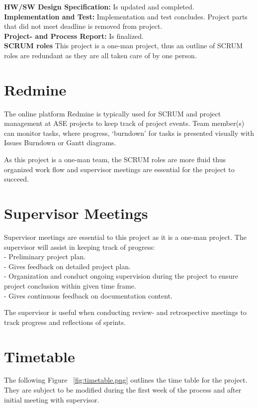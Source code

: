 \textbf{HW/SW Design Specification:} Is updated and completed. \\

\textbf{Implementation and Test:} Implementation and test concludes. Project parts that did not meet deadline is removed from project. \\

\textbf{Project- and Process Report:} Is finalized. \\

\textbf{SCRUM roles}
This project is a one-man project, thus an outline of SCRUM roles are redundant as they are all taken care of by one person. \\

\section{Redmine}
The online platform Redmine is typically used for SCRUM and project management at ASE projects to keep track of project events. Team member(s) can monitor tasks, where progress, `burndown' for tasks is presented visually with Issues Burndown or Gantt diagrams. \newline

As this project is a one-man team, the SCRUM roles are more fluid thus organized work flow and supervisor meetings are essential for the project to succeed. \\

\section{Supervisor Meetings}
Supervisor meetings are essential to this project as it is a one-man project. The supervisor will assist in keeping track of progress: \\
- Preliminary project plan. \\
- Gives feedback on detailed project plan. \\
- Organization and conduct ongoing supervision during the project to ensure project conclusion within given time frame. \\
- Gives continuous feedback on documentation content. \newline

The supervisor is useful when conducting review- and retrospective meetings to track progress and reflections of sprints. \newline

\section{Timetable}
The following Figure ~\ref{fig:timetable.png} outlines the time table for the project. They are subject to be modified during the first week of the process and after initial meeting with supervisor.

